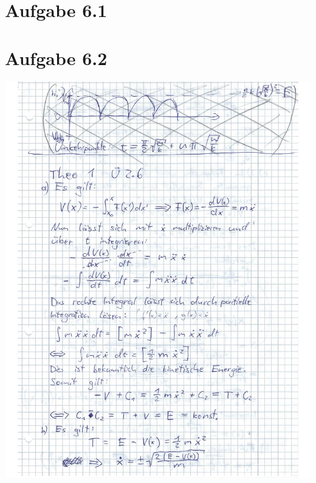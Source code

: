 \documentclass{theozettel}
\begin{document}

\section*{Aufgabe 6.1} 




\section*{Aufgabe 6.2} 

\begin{center}
\includegraphics[width=15cm]{A2-Teil1.pdf}\\

\end{center}
\end{document}
